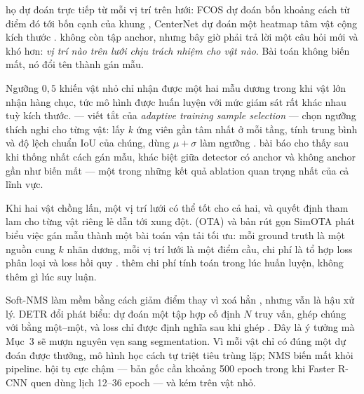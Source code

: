 \documentclass[../../../deep_learning.tex]{subfiles}
\begin{document}
\begin{mach}
\item {} \gp họ  dự đoán trực tiếp từ mỗi vị trí trên lưới: FCOS dự đoán bốn khoảng cách từ điểm đó tới bốn cạnh của khung \cite{tian2019fcos}, CenterNet dự đoán một heatmap tâm vật cộng kích thước \cite{zhou2019objects}. \gia không còn tập anchor, nhưng bây giờ phải trả lời một câu hỏi mới và khó hơn: \emph{vị trí nào trên lưới chịu trách nhiệm cho vật nào}. Bài toán không biến mất, nó đổi tên thành gán mẫu.
\item {} Ngưỡng \(0{,}5\) khiến vật nhỏ chỉ nhận được một hai mẫu dương trong khi vật lớn nhận hàng chục, tức mô hình được huấn luyện với mức giám sát rất khác nhau tuỳ kích thước. \gp {} --- viết tắt của \emph{adaptive training sample selection} --- chọn ngưỡng thích nghi cho từng vật: lấy \(k\) ứng viên gần tâm nhất ở mỗi tầng, tính trung bình và độ lệch chuẩn IoU của chúng, dùng \(\mu + \sigma\) làm ngưỡng \cite{zhang2020atss}. \hq bài báo cho thấy sau khi thống nhất cách gán mẫu, khác biệt giữa detector có anchor và không anchor gần như biến mất --- một trong những kết quả ablation quan trọng nhất của cả lĩnh vực.
\item {} Khi hai vật chồng lấn, một vị trí lưới có thể tốt cho cả hai, và quyết định tham lam cho từng vật riêng lẻ dẫn tới xung đột. \gp {} (OTA) và bản rút gọn SimOTA phát biểu việc gán mẫu thành một bài toán vận tải tối ưu: mỗi ground truth là một nguồn cung \(k\) nhãn dương, mỗi vị trí lưới là một điểm cầu, chi phí là tổ hợp loss phân loại và loss hồi quy \cite{ge2021ota}. \gia thêm chi phí tính toán trong lúc huấn luyện, không thêm gì lúc suy luận.
\item {} Soft-NMS làm mềm bằng cách giảm điểm thay vì xoá hẳn \cite{bodla2017softnms}, nhưng vẫn là hậu xử lý. \gp DETR đổi phát biểu: dự đoán một tập hợp cố định \(N\) truy vấn, ghép chúng với  bằng  một--một, và loss chỉ được định nghĩa sau khi ghép \cite{carion2020detr}. Đây là ý tưởng  mà Mục~3 sẽ mượn nguyên vẹn sang segmentation. Vì mỗi vật chỉ có đúng một dự đoán được thưởng, mô hình học cách tự triệt tiêu trùng lặp; NMS biến mất khỏi pipeline. \gia hội tụ cực chậm --- bản gốc cần khoảng 500 epoch trong khi Faster R-CNN quen dùng lịch 12--36 epoch --- và kém trên vật nhỏ.

\end{mach}
\end{document}
